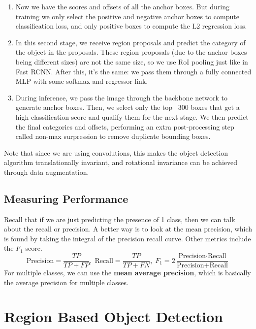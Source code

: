 \documentclass{article}
\theoremstyle{definition}
\theoremstyle{remark}
\theoremstyle{definition}
\begin{document}
\begin{enumerate}
        \item Now we have the scores and offsets of all the anchor boxes. But during training we only select the positive and negative anchor boxes to compute classification loss, and only positive boxes to compute the L2 regression loss. 

        \item In this second stage, we receive region proposals and predict the category of the object in the proposals. These region proposals (due to the anchor boxes being different sizes) are not the same size, so we use RoI pooling just like in Fast RCNN. After this, it's the same: we pass them through a fully connected MLP with some softmax and regressor link. 

        \item During inference, we pass the image through the backbone network to generate anchor boxes. Then, we select only the top ~300 boxes that get a high classification score and qualify them for the next stage. We then predict the final categories and offsets, performing an extra post-processing step called non-max surpression to remove duplicate bounding boxes. 
    \end{enumerate}

    Note that since we are using convolutions, this makes the object detection algorithm translationally invariant, and rotational invariance can be achieved through data augmentation. 

  \subsection{Measuring Performance} 

    Recall that if we are just predicting the presence of 1 class, then we can talk about the recall or precision. A better way is to look at the mean precision, which is found by taking the integral of the precision recall curve. Other metrics include the $F_1$ score. 
    \[\text{Precision} = \frac{TP}{TP + FP}, \; \text{Recall} = \frac{TP}{TP + FN}, \; F_1 = 2 \frac{\text{Precision} \cdot \text{Recall}}{\text{Precision} + \text{Recall}}\]
    For multiple classes, we can use the \textbf{mean average precision}, which is basically the average precision for multiple classes.



\section{Region Based Object Detection}
\end{document}
